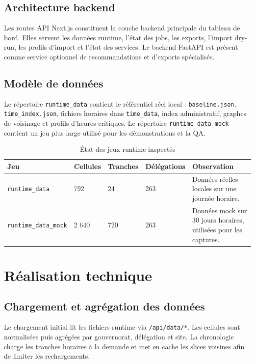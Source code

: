 \documentclass[12pt,a4paper,oneside]{report}
\begin{document}
\section{Architecture backend}
Les routes API Next.js constituent la couche backend principale du tableau de bord. Elles servent les données runtime, l'état des jobs, les exports, l'import dry-run, les profils d'import et l'état des services. Le backend FastAPI est présent comme service optionnel de recommandations et d'exports spécialisés.

\section{Modèle de données}
Le répertoire \texttt{runtime\_data} contient le référentiel réel local : \texttt{baseline.json}, \texttt{time\_index.json}, fichiers horaires dans \texttt{time\_data}, index administratif, graphes de voisinage et profils d'heures critiques. Le répertoire \texttt{runtime\_data\_mock} contient un jeu plus large utilisé pour les démonstrations et la QA.

\begin{table}[H]
\centering
\caption{État des jeux runtime inspectés}
\label{tab:runtime-data}
\begin{tabularx}{\textwidth}{p{3.4cm}p{2.2cm}p{2.4cm}p{2.4cm}X}
\toprule
\textbf{Jeu} & \textbf{Cellules} & \textbf{Tranches} & \textbf{Délégations} & \textbf{Observation} \\
\midrule
\texttt{runtime\_data} & 792 & 24 & 263 & Données réelles locales sur une journée horaire. \\
\texttt{runtime\_data\_mock} & 2 640 & 720 & 263 & Données mock sur 30 jours horaires, utilisées pour les captures. \\
\bottomrule
\end{tabularx}
\end{table}

\chapter{Réalisation technique}
\section{Chargement et agrégation des données}
Le chargement initial lit les fichiers runtime via \texttt{/api/data/*}. Les cellules sont normalisées puis agrégées par gouvernorat, délégation et site. La chronologie charge les tranches horaires à la demande et met en cache les slices voisines afin de limiter les rechargements.
\end{document}
